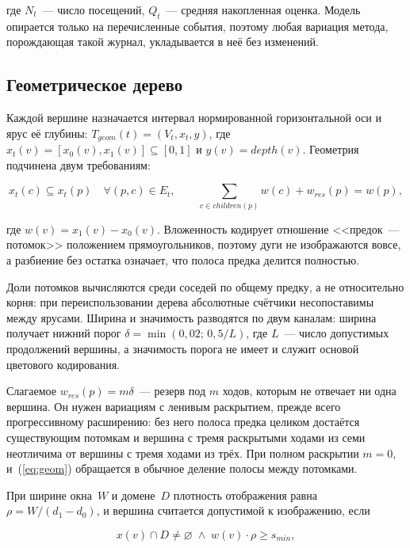 \documentclass[12pt,a4paper]{article}
\begin{document}
где $N_t$~--- число посещений, $Q_t$~--- средняя накопленная оценка. Модель
опирается только на перечисленные события, поэтому любая вариация метода,
порождающая такой журнал, укладывается в неё без изменений.

\subsection{Геометрическое дерево}

Каждой вершине назначается интервал нормированной горизонтальной оси и ярус
её глубины: $T_{geom}(t) = (V_t, x_t, y)$, где $x_t(v) = [x_0(v), x_1(v)]
\subseteq [0,1]$ и $y(v) = depth(v)$. Геометрия подчинена двум требованиям:

\begin{equation}
x_t(c) \subseteq x_t(p) \quad \forall (p,c) \in E_t,
\qquad \sum_{c \in children(p)} w(c) + w_{res}(p) = w(p),
\label{eq:geom}
\end{equation}

где $w(v) = x_1(v) - x_0(v)$. Вложенность кодирует отношение <<предок~---
потомок>> положением прямоугольников, поэтому дуги не изображаются вовсе, а
разбиение без остатка означает, что полоса предка делится полностью.

Доли потомков вычисляются среди соседей по общему предку, а не относительно
корня: при переиспользовании дерева абсолютные счётчики несопоставимы между
ярусами. Ширина и значимость разводятся по двум каналам: ширина получает
нижний порог $\delta = \min(0{,}02;\, 0{,}5/L)$, где $L$~--- число
допустимых продолжений вершины, а значимость порога не имеет и служит
основой цветового кодирования.

Слагаемое $w_{res}(p) = m\delta$~--- резерв под $m$ ходов, которым не
отвечает ни одна вершина. Он нужен вариациям с ленивым раскрытием, прежде
всего прогрессивному расширению: без него полоса предка целиком достаётся
существующим потомкам и вершина с тремя раскрытыми ходами из семи
неотличима от вершины с тремя ходами из трёх. При полном раскрытии $m = 0$,
и~(\ref{eq:geom}) обращается в обычное деление полосы между потомками.

При ширине окна~$W$ и домене~$D$ плотность отображения равна $\rho = W /
(d_1 - d_0)$, и вершина считается допустимой к изображению, если

\begin{equation}
x(v) \cap D \ne \varnothing \;\wedge\; w(v)\cdot\rho \ge s_{min},
\label{eq:adm}
\end{equation}
\end{document}
